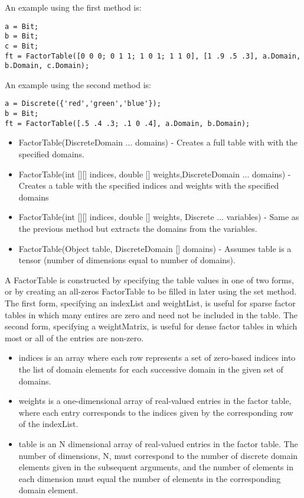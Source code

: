 An example using the first method is:
\begin{lstlisting}
a = Bit;
b = Bit;
c = Bit;
ft = FactorTable([0 0 0; 0 1 1; 1 0 1; 1 1 0], [1 .9 .5 .3], a.Domain, b.Domain, c.Domain);
\end{lstlisting}

An example using the second method is:
\begin{lstlisting}
a = Discrete({'red','green','blue'});
b = Bit;
ft = FactorTable([.5 .4 .3; .1 0 .4], a.Domain, b.Domain);
\end{lstlisting}

\fi

\ifjava

\begin{itemize}
\item FactorTable(DiscreteDomain ... domains) - Creates a full table with with the specified domains.
\item FactorTable(int [][] indices, double [] weights,DiscreteDomain ... domains) - Creates a table with the specified indices and weights with the specified domains
\item FactorTable(int [][] indices, double [] weights, Discrete ... variables) - Same as the previous method but extracts the domains from the variables.
\item FactorTable(Object table, DiscreteDomain [] domains) - Assumes table is a tensor (number of dimensions equal to number of domains).  
\end{itemize}

A FactorTable is constructed by specifying the table values in one of two forms, or by creating an all-zeros FactorTable to be filled in later using the set method.  The first form, specifying an indexList and weightList, is useful for sparse factor tables in which many entires are zero and need not be included in the table.  The second form, specifying a weightMatrix, is useful for dense factor tables in which most or all of the entries are non-zero.

\begin{itemize}
\item indices is an array where each row represents a set of zero-based indices into the list of domain elements for each successive domain in the given set of domains.
\item weights is a one-dimensional array of real-valued entries in the factor table, where each entry corresponds to the indices given by the corresponding row of the indexList.
\item table is an N dimensional array of real-valued entries in the factor table.  The number of dimensions, N, must correspond to the number of discrete domain elements given in the subsequent arguments, and the number of elements in each dimension must equal the number of elements in the corresponding domain element.
\end{itemize}

